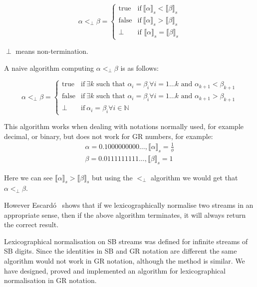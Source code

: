 \documentclass{cs4rep}
\begin{document}
\[ \alpha <_{\perp} \beta = \left\{ \begin{array}{ll}
  \mbox{true} & \mbox{if} \ \llbracket \alpha \rrbracket_{s} < \llbracket \beta \rrbracket_{s} \\
  \mbox{false} & \mbox{if} \ \llbracket \alpha \rrbracket_{s} > \llbracket \beta \rrbracket_{s} \\
  \perp & \mbox{if } \llbracket \alpha \rrbracket_{s} = \llbracket \beta \rrbracket_{s}
\end{array}
\right. \]

$\perp$ means non-termination.

A naive algorithm computing $\alpha <_{\perp} \beta$ is as follows:

\[ \alpha <_{\perp} \beta = \left\{ \begin{array}{ll}
\mbox{true} & \mbox{if} \ \exists k \mbox{ such that } \alpha_{i} = \beta_{i} \forall i = 1 \ldots k \mbox{ and } \alpha_{k+1} < \beta_{k+1} \\
\mbox{false} & \mbox{if} \ \exists k \mbox{ such that } \alpha_{i} = \beta_{i} \forall i = 1 \ldots k \mbox{ and } \alpha_{k+1} > \beta_{k+1} \\
\perp & \mbox{if} \ \alpha_{i} = \beta_{i} \forall i \in \mathbb{N}
\end{array}
\right. \]

This algorithm works when dealing with notations normally used, for example decimal, or binary, but does not work for GR numbers, for example:
\[ \begin{array}{l}
 \alpha = 0.1000000000 \ldots, \llbracket \alpha \rrbracket_{s} = \frac{1}{\phi}  \\
 \beta = 0.0111111111 \ldots, \llbracket \beta \rrbracket_{s} =1
\end{array}\]

Here we can see $ \llbracket \alpha \rrbracket_{s} > \llbracket \beta
\rrbracket_{s} $ but using the $<_{\perp}$ algorithm we would get that
$\alpha <_{\perp} \beta$.

However Escard\'o~\cite{kn:Escardo} shows that if we lexicographically
normalise two streams in an appropriate sense, then if the above
algorithm terminates, it will always return the correct result.

Lexicographical normalisation on SB streams was defined for infinite
streams of SB digits. Since the identities in SB and GR notation are
different the same algorithm would not work in GR notation, although
the method is similar. We have designed, proved and implemented an
algorithm for lexicographical normalisation in GR notation.
\end{document}
